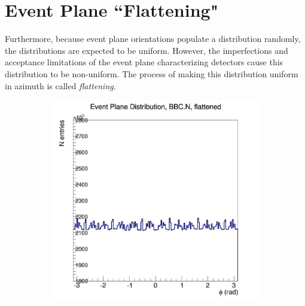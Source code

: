 \section{Event Plane ``Flattening"}
Furthermore, because event plane orientations populate a distribution randomly, the distributions are expected to be uniform. However, the imperfections and acceptance limitations of the event plane characterizing detectors cause this distribution to be non-uniform. The process of making this distribution uniform in azimuth is called \textit{flattening}.

\begin{figure}
  \centering
    \begin{subfigure}[p]{0.4\textwidth}
    \includegraphics[width=1\textwidth]{EPflattening/flatbbcn.jpg}
    \end{subfigure}
    \begin{subfigure}[p]{0.4\textwidth}

\end{subfigure}
\end{figure}
